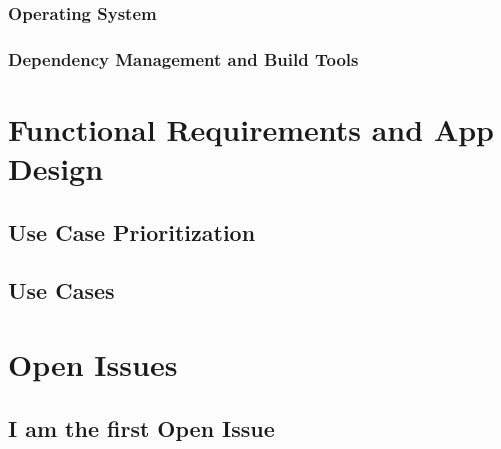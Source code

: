 \documentclass[11pt,fleqn]{book} %
\begin{document}
		\subsection{Operating System}
		\subsection{Dependency Management and Build Tools}



\chapter{Functional Requirements and App Design}

	\section{Use Case Prioritization}
	\section{Use Cases}
	
	


\chapter{Open Issues}

\section{I am the first Open Issue}
\end{document}
